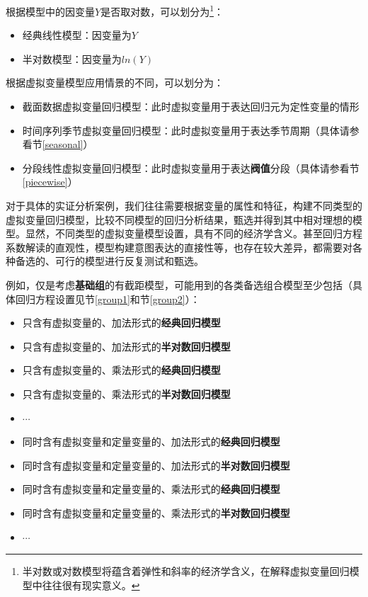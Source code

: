 \documentclass[12pt,(landscape,a4paper),(portrait,a4paper)]{article}
\providecommand{\tightlist}{%
  \setlength{\itemsep}{0pt}\setlength{\parskip}{0pt}}
\let\rmarkdownfootnote\footnote%
\def\footnote{\protect\rmarkdownfootnote}
\theoremstyle{definition}
\theoremstyle{definition}
\theoremstyle{definition}
\theoremstyle{remark}
\begin{document}
根据模型中的因变量\(Y\)是否取对数，可以划分为\footnote{半对数或对数模型将蕴含着弹性和斜率的经济学含义，在解释虚拟变量回归模型中往往很有现实意义。}：

\begin{itemize}
\tightlist
\item
  经典线性模型：因变量为\(Y\)
\item
  半对数模型：因变量为\(ln(Y)\)
\end{itemize}

根据虚拟变量模型应用情景的不同，可以划分为：

\begin{itemize}
\tightlist
\item
  截面数据虚拟变量回归模型：此时虚拟变量用于表达回归元为定性变量的情形
\item
  时间序列季节虚拟变量回归模型：此时虚拟变量用于表达季节周期（具体请参看节\ref{seasonal}）
\item
  分段线性虚拟变量回归模型：此时虚拟变量用于表达\textbf{阀值}分段（具体请参看节\ref{piecewise}）
\end{itemize}

对于具体的实证分析案例，我们往往需要根据变量的属性和特征，构建不同类型的虚拟变量回归模型，比较不同模型的回归分析结果，甄选并得到其中相对理想的模型。显然，不同类型的虚拟变量模型设置，具有不同的经济学含义。甚至回归方程系数解读的直观性，模型构建意图表达的直接性等，也存在较大差异，都需要对各种备选的、可行的模型进行反复测试和甄选。

例如，仅是考虑\textbf{基础组}的有截距模型，可能用到的各类备选组合模型至少包括（具体回归方程设置见节\ref{group1}和节\ref{group2}）：

\begin{itemize}
\tightlist
\item
  只含有虚拟变量的、加法形式的\textbf{经典回归模型}
\item
  只含有虚拟变量的、加法形式的\textbf{半对数回归模型}
\item
  只含有虚拟变量的、乘法形式的\textbf{经典回归模型}
\item
  只含有虚拟变量的、乘法形式的\textbf{半对数回归模型}
\item
  \(\cdots\)
\item
  同时含有虚拟变量和定量变量的、加法形式的\textbf{经典回归模型}
\item
  同时含有虚拟变量和定量变量的、加法形式的\textbf{半对数回归模型}
\item
  同时含有虚拟变量和定量变量的、乘法形式的\textbf{经典回归模型}
\item
  同时含有虚拟变量和定量变量的、乘法形式的\textbf{半对数回归模型}
\item
  \(\cdots\)
\end{itemize}
\end{document}
